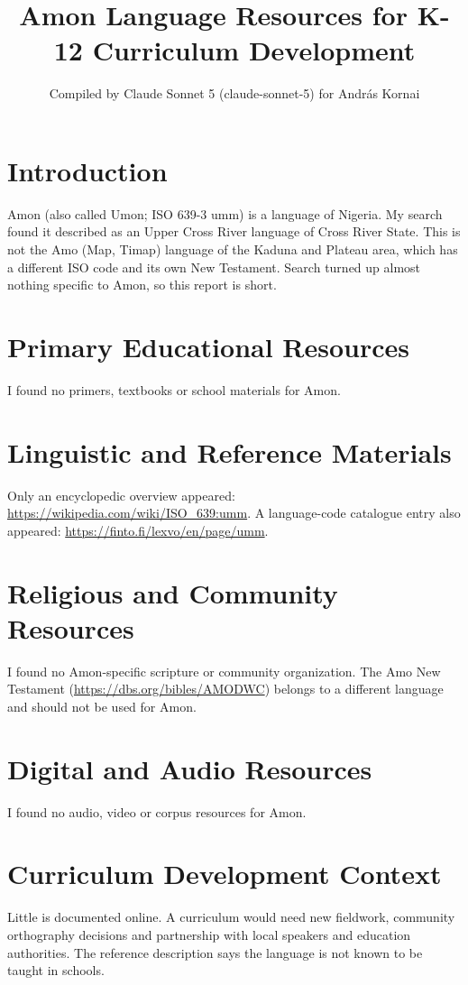 \documentclass[12pt]{article}
\title{Amon Language Resources for K-12 Curriculum Development}
\author{Compiled by Claude Sonnet 5 (claude-sonnet-5) for Andr\'as Kornai}
\date{}
\begin{document}
\maketitle
\section{Introduction}
Amon (also called Umon; ISO 639-3 umm) is a language of Nigeria. My search found it described as an Upper Cross River language of Cross River State. This is not the Amo (Map, Timap) language of the Kaduna and Plateau area, which has a different ISO code and its own New Testament. Search turned up almost nothing specific to Amon, so this report is short.
\section{Primary Educational Resources}
I found no primers, textbooks or school materials for Amon.
\section{Linguistic and Reference Materials}
Only an encyclopedic overview appeared: \url{https://wikipedia.com/wiki/ISO_639:umm}. A language-code catalogue entry also appeared: \url{https://finto.fi/lexvo/en/page/umm}.
\section{Religious and Community Resources}
I found no Amon-specific scripture or community organization. The Amo New Testament (\url{https://dbs.org/bibles/AMODWC}) belongs to a different language and should not be used for Amon.
\section{Digital and Audio Resources}
I found no audio, video or corpus resources for Amon.
\section{Curriculum Development Context}
Little is documented online. A curriculum would need new fieldwork, community orthography decisions and partnership with local speakers and education authorities. The reference description says the language is not known to be taught in schools.
\end{document}
